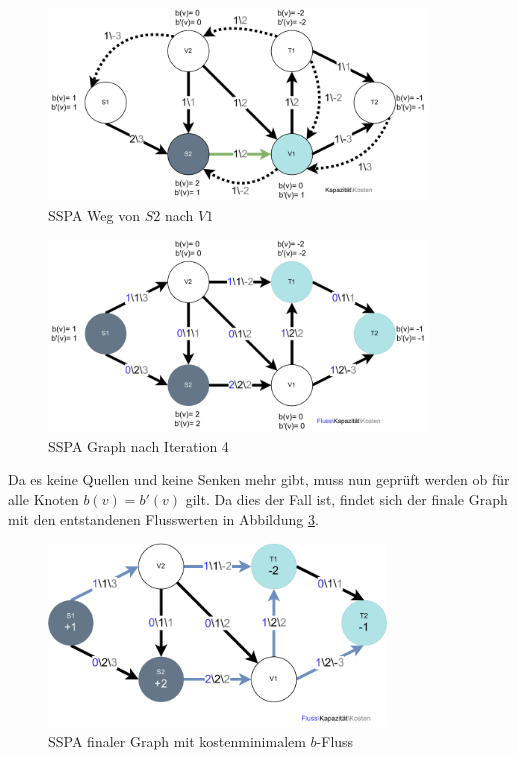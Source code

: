 \begin{figure}[H]
\centering
\includegraphics[width=0.9\textwidth]{img/anton/sspa-Step4-shortestPath.pdf}
\caption{SSPA Weg von $S2$ nach $V1$}
\label{fig:sspa_step4-shortest-Path}
\end{figure}

\begin{figure}[H]
\centering
\includegraphics[width=0.9\textwidth]{img/anton/sspa-Step4-newGraph.pdf}
\caption{SSPA Graph nach Iteration 4}
\label{fig:sspa_step4-new-Graph}
\end{figure}

Da es keine Quellen und keine Senken mehr gibt, muss nun geprüft werden ob für alle Knoten $b(v) = b'(v)$ gilt. Da dies der Fall ist, findet sich der finale Graph mit den entstandenen Flusswerten in Abbildung \ref{fig:sspa_step5-final}.

\begin{figure}[H]
\centering
\includegraphics[width=0.8\textwidth]{img/anton/sspa-Step5-FinalMitFluss.pdf}
\caption{SSPA finaler Graph mit kostenminimalem $b$-Fluss}
\label{fig:sspa_step5-final}
\end{figure}

